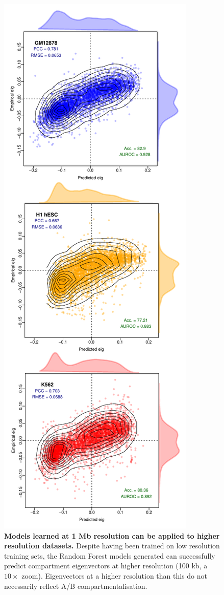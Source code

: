 \documentclass[a4paper,11pt,oneside]{book}
\begin{document}
\begin{figure}
\begin{center} 
\includegraphics[width=.6\textwidth]{figs/100kb.pdf}
\captionsetup{width=\textwidth} 
\caption{ {\bf Models learned at 1 Mb resolution can be applied to higher resolution datasets. }
Despite having been trained on low resolution training sets, the Random Forest models generated can successfully predict compartment eigenvectors at higher resolution (100 kb, a $10\times$ zoom). Eigenvectors at a higher resolution than this do not necessarily reflect A/B compartmentalisation.
}\label{fig:100kb}
\end{center} 
\end{figure} 
\end{document}
